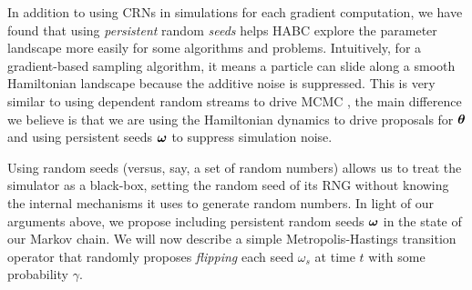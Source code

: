 \documentclass[]{article}
\begin{document}
In addition to using CRNs in simulations for each gradient computation, we have found that using {\em persistent} random {\em seeds} helps  HABC explore the parameter landscape more easily for some algorithms and problems.  Intuitively, for a gradient-based sampling algorithm, it means a particle can slide along a smooth Hamiltonian landscape because    the additive noise is suppressed.  This is very similar to using dependent random streams to drive MCMC \cite{Murray2012,Neal2012}, the main difference we believe is that we are using the Hamiltonian dynamics to drive proposals for ${\bm \theta}$ and using persistent seeds ${\bm \omega}$ to suppress simulation noise.

  
Using random seeds (versus, say, a set of random numbers) allows us to treat the simulator as a black-box, setting the random seed of its RNG without knowing the internal mechanisms it uses to generate random numbers.  In light of our arguments above, we propose including persistent random seeds ${\bm \omega}$ in the state of our Markov chain.    We will now describe a simple  Metropolis-Hastings transition operator that randomly proposes {\em flipping} each seed $\omega_s$ at time $t$ with some probability $\gamma$.  
\end{document}
